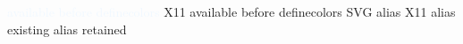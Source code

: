 \documentclass{article}
\begin{document}
\textcolor{AliceBlue}{available before definecolors}
\textcolor{AntiqueWhite1}{X11 available before definecolors}
\textcolor{B6SVG}{SVG alias}
\textcolor{B6X11}{X11 alias}
\textcolor{B6SVG}{existing alias retained}
\end{document}
